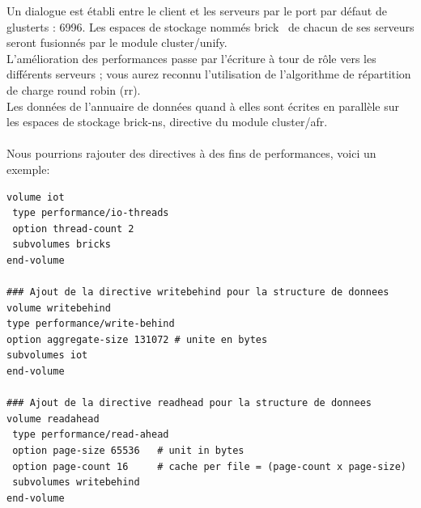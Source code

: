 \documentclass[12pt]{report}
\begin{document}
Un dialogue est établi entre le client et les serveurs par le port par défaut de glusterts : 6996. Les espaces de stockage nommés \og brick\fg~ de chacun de ses serveurs seront fusionnés par le module \og cluster/unify\fg.\\ L'amélioration des performances passe par l'écriture à tour de rôle vers les différents serveurs ; vous aurez reconnu l'utilisation de l'algorithme de répartition de charge round robin (rr).\\
Les données de l'annuaire de données quand à elles sont écrites en parallèle sur les espaces de stockage \og brick-ns\fg, directive du module \og cluster/afr\fg.\\\\
Nous pourrions rajouter des directives à des fins de performances, voici un exemple:
\begin{lstlisting}
volume iot
 type performance/io-threads
 option thread-count 2
 subvolumes bricks
end-volume

### Ajout de la directive writebehind pour la structure de donnees
volume writebehind
type performance/write-behind
option aggregate-size 131072 # unite en bytes
subvolumes iot
end-volume

### Ajout de la directive readhead pour la structure de donnees
volume readahead
 type performance/read-ahead
 option page-size 65536   # unit in bytes
 option page-count 16     # cache per file = (page-count x page-size)
 subvolumes writebehind
end-volume
	  \end{lstlisting}
\end{document}
